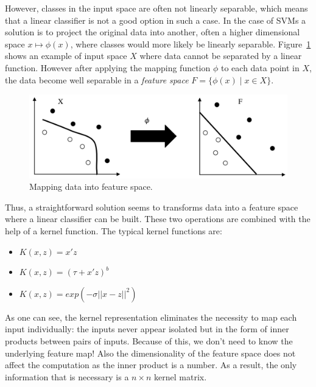 However, classes in the input space are often not linearly separable, which means that a linear classifier is not a good option in such a case. In the case of SVMs a solution is to project the original data into another, often a higher dimensional space \(x \mapsto \phi(x) \), where classes would more likely be linearly separable. Figure~\ref{fig:hyperplane2} shows an example of input space \(X\) where data cannot be separated by a linear function. However after applying the mapping function \(\phi\) to each data point in \(X\), the data become well separable in a \textit{feature space} \(F = \{ \phi(x)\; | \; x \in X\}\).
\begin{figure}[h!]
    \centering
    \includegraphics[scale=0.6]{Graphics/svp-separation.png}
    \caption{Mapping data into feature space.}
    \label{fig:hyperplane2}
\end{figure}

Thus, a straightforward solution seems to transforms data into a feature space where a linear classifier can be built. These two operations are combined with the help of a kernel function. The typical kernel functions are:
\begin{itemize}
            \item \(K(x,z) = x'z \)
            \item \(K(x,z) = (\tau + x'z)^b\)
            \item \(K(x,z) = exp(-\sigma||x-z||^2)\)
\end{itemize}

As one can see, the kernel representation eliminates the necessity to map each input individually: the inputs never appear isolated but in the form of inner products between pairs of inputs. Because of this, we don't need to know the underlying feature map! Also the dimensionality of the feature space does not affect the computation as the inner product is a number. As a result, the only information that is necessary is a \(n\times n\) kernel matrix.

